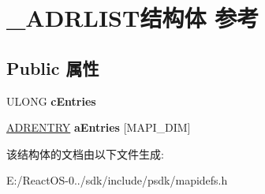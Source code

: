 \hypertarget{struct___a_d_r_l_i_s_t}{}\section{\+\_\+\+A\+D\+R\+L\+I\+S\+T结构体 参考}
\label{struct___a_d_r_l_i_s_t}
\subsection*{Public 属性}
\begin{DoxyCompactItemize}
\item 
\mbox{\label{struct___a_d_r_l_i_s_t_a0673ee50fd49d8859d797187821bbb3d}} 
U\+L\+O\+NG {\bfseries c\+Entries}
\item 
\mbox{\label{struct___a_d_r_l_i_s_t_ac2a021f08958a02d824c91d2aab3d2f8}} 
\hyperlink{struct___a_d_r_e_n_t_r_y}{A\+D\+R\+E\+N\+T\+RY} {\bfseries a\+Entries} \mbox{[}M\+A\+P\+I\+\_\+\+D\+IM\mbox{]}
\end{DoxyCompactItemize}


该结构体的文档由以下文件生成\+:\begin{DoxyCompactItemize}
\item 
E\+:/\+React\+O\+S-\/0../sdk/include/psdk/mapidefs.\+h\end{DoxyCompactItemize}

